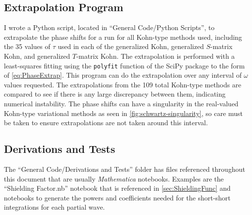 \documentclass[Dissertation.tex]{subfiles}
\begin{document}
\subsection*{Extrapolation Program}
I wrote a Python \cite{Python} script, located in ``General Code/Python Scripts'',
to extrapolate the phase shifts for a 
run for all Kohn-type methods used, including the 35 values of $\tau$ used 
in each of the generalized Kohn, generalized $S$-matrix Kohn, and generalized
$T$-matrix Kohn. The extrapolation is performed with a least-squares fitting 
using the \texttt{polyfit} function of the SciPy package \cite{SciPy} to the 
form of \cref{eq:PhaseExtrap}. This program can do the extrapolation over any 
interval of $\omega$ values requested. The extrapolations from the 109 total 
Kohn-type methods are compared to see if there is any large discrepancy between 
them, indicating numerical instability. The phase shifts can have a 
singularity in the real-valued Kohn-type variational methods
as seen in \cref{fig:schwartz-singularity}, so 
care must be taken to ensure extrapolations are not taken around this interval.


\subsection*{Derivations and Tests}
The ``General Code/Derivations and Tests'' folder has files referenced
throughout this document that are usually \emph{Mathematica} notebooks.
Examples are the ``Shielding Factor.nb'' notebook that is referenced in
\cref{sec:ShieldingFunc} and notebooks to generate the powers and coefficients
needed for the short-short integrations for each partial wave.


%
%
%
%
%
%
%
%
%




\biblio
\end{document}
